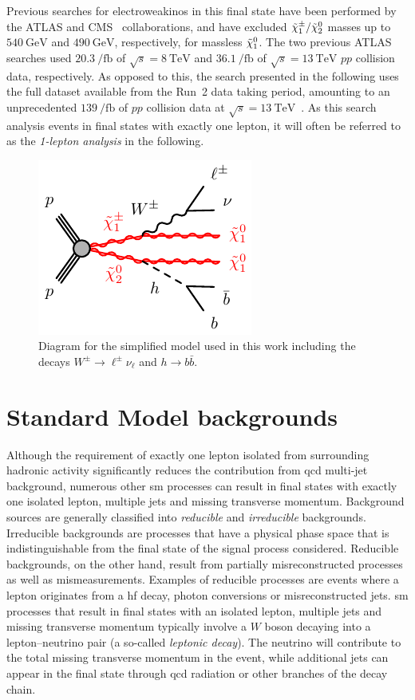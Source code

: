 Previous searches for electroweakinos in this final state have been performed by the \mbox{ATLAS} \cite{SUSY-2013-23,SUSY-2017-01} and CMS~\cite{CMS-SUS-16-043} collaborations, and have excluded $\tilde{\chi}_1^\pm/\tilde{\chi}_2^0$ masses up to $\SI{540}{\GeV}$ and $\SI{490}{\GeV}$, respectively, for massless $\tilde{\chi}_1^0$. The two previous ATLAS searches used $\SI{20.3}{\per\femto\barn}$ of $\sqrt{s}=\SI{8}{\TeV}$ and $\SI{36.1}{\per\femto\barn}$ of $\sqrt{s}=\SI{13}{\TeV}$ $pp$ collision data, respectively. As opposed to this, the search presented in the following uses the full dataset available from the Run~2 data taking period, amounting to an unprecedented $\SI{139}{\per\femto\barn}$ of $pp$ collision data at $\sqrt{s}=\SI{13}{\TeV}$~\cite{SUSY-2019-08}. As this search analysis events in final states with exactly one lepton, it will often be referred to as the \textit{1-lepton analysis} in the following.

\begin{figure}
	\centering\includegraphics[width=.4\textwidth]{model_c1n2_Wh}
	\caption{Diagram for the simplified model used in this work including the decays $W^\pm\rightarrow\ell^\pm\nu_\ell$ and $h\rightarrow b\bar{b}$.}\label{fig:Wh_model_full}
\end{figure}

\section{Standard Model backgrounds}

Although the requirement of exactly one lepton isolated from surrounding hadronic activity significantly reduces the contribution from \gls{qcd} multi-jet background, numerous other \gls{sm} processes can result in final states with exactly one isolated lepton, multiple jets and missing transverse momentum. Background sources are generally classified into \textit{reducible} and \textit{irreducible} backgrounds. Irreducible backgrounds are processes that have a physical phase space that is indistinguishable from the final state of the signal process considered. Reducible backgrounds, on the other hand, result from partially misreconstructed processes as well as mismeasurements. Examples of reducible processes are events where a lepton originates from a \gls{hf} decay, photon conversions or misreconstructed jets. \gls{sm} processes that result in final states with an isolated lepton, multiple jets and missing transverse momentum typically involve a $W$ boson decaying into a lepton--neutrino pair (a so-called \textit{leptonic decay}). The neutrino will contribute to the total missing transverse momentum in the event, while additional jets can appear in the final state through \gls{qcd} radiation or other branches of the decay chain.

